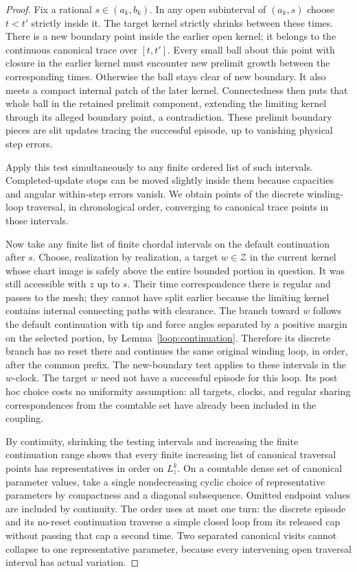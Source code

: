 \begin{proof}
Fix a rational $s\in(a_k,b_k)$.  In any open subinterval of
$(a_k,s)$ choose $t<t'$ strictly inside it.  The target kernel strictly
shrinks between these times.  There is a new boundary point inside
the earlier open kernel; it belongs to the continuous canonical trace
over $[t,t']$.  Every small ball about this point with closure in the
earlier kernel must encounter new prelimit growth between the
corresponding times.  Otherwise the ball stays clear of new boundary.
It also meets a compact internal patch of the later kernel.  Connectedness
then puts that whole ball in the retained prelimit component, extending
the limiting kernel through its alleged boundary point, a contradiction.
These prelimit boundary pieces are slit updates tracing the successful
episode, up to vanishing physical step errors.

Apply this test simultaneously to any finite ordered list of such
intervals.  Completed-update stops can be moved slightly inside them
because capacities and angular within-step errors vanish.  We obtain
points of the discrete winding-loop traversal, in chronological order,
converging to canonical trace points in those intervals.

Now take any finite list of finite chordal intervals on the default
continuation after $s$.  Choose, realization by realization, a target
$w\in\mathcal Z$ in the current kernel whose chart image is safely
above the entire bounded portion in question.  It was still accessible
with $z$ up to $s$.  Their time correspondence there is regular and
passes to the mesh; they cannot have split earlier because the limiting
kernel contains internal connecting paths with clearance.  The branch
toward $w$ follows the default continuation with tip and force angles
separated by a positive margin on the selected portion, by
Lemma~\ref{loop:continuation}.  Therefore its discrete branch has no
reset there and continues the same original winding loop, in order,
after the common prefix.  The new-boundary test applies to these
intervals in the $w$-clock.  The target $w$ need not have a successful
episode for this loop.  Its post hoc choice costs no uniformity
assumption: all targets, clocks, and regular sharing correspondences
from the countable set have already been included in the coupling.

By continuity, shrinking the testing intervals and increasing the
finite continuation range shows that every finite increasing list of
canonical traversal points has representatives in order on $L_z^k$.
On a countable dense set of canonical parameter values, take a
single nondecreasing cyclic choice of representative parameters by
compactness and a diagonal subsequence.  Omitted endpoint values are
included by continuity.  The order uses at most one turn: the discrete
episode and its no-reset continuation traverse a simple closed loop
from its released cap without passing that cap a second time.
Two separated canonical visits cannot collapse to one representative
parameter, because every intervening open traversal interval has
actual variation.


\end{proof}
